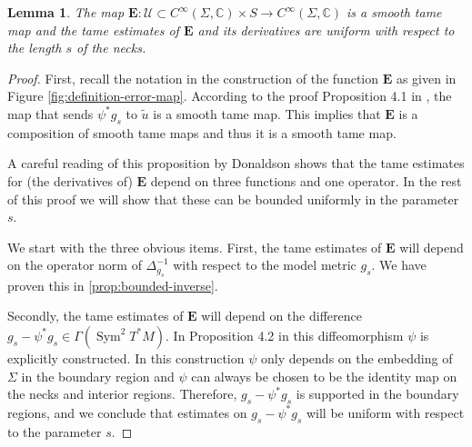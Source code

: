 \documentclass[preprint,12pt]{elsarticle}
\numberwithin{table}{section}
\newtheorem{lemma}{Lemma}[section]
\newcommand{\Z}{\mathbb{Z}}
\newcommand{\C}{\mathbb{C}}
\begin{document}
\begin{lemma}
	\label{lem:Nash-Moser:tameness-E}
	The map $\mathbf{E}\colon \mathcal{U} \subset C^\infty(\Sigma, \C)\times S \to C^\infty(\Sigma, \C)$ is a smooth tame map and the tame estimates of $\mathbf{E}$ and its derivatives are uniform with respect to the length $s$ of the necks.
\end{lemma}
\begin{proof}
	
	First, recall the notation in the construction of the function $\mathbf{E}$ as given in Figure \ref{fig:definition-error-map}.
	According to the proof Proposition 4.1 in \cite{Donaldson2021}, the map that sends $\psi^* g_s$ to $\tilde u$ is a smooth tame map. This implies that $\mathbf{E}$ is a composition of smooth tame maps and thus it is a smooth tame map.

	A careful reading of this proposition by Donaldson shows that the tame estimates for (the derivatives of) $\mathbf{E}$ depend on three functions and one operator. In the rest of this proof we will show that these can be bounded uniformly in the parameter $s$. 
	
	We start with the three obvious items. First, the tame estimates of $\mathbf{E}$ will depend on the operator norm of $\Delta^{-1}_{g_s}$ with respect to the model metric $g_s$. We have proven this in \cref{prop:bounded-inverse}.

	Secondly, the tame estimates of $\mathbf{E}$ will depend on the difference $g_s - \psi^* g_s \in \Gamma(\operatorname{Sym}^2 T^*M)$. In Proposition 4.2 in \cite{Donaldson2021} this diffeomorphism $\psi$ is explicitly constructed. In this construction $\psi$ only depends on the embedding of $\Sigma$ in the boundary region and $\psi$ can always be chosen to be the identity map on the necks and interior regions. Therefore, $g_s - \psi^* g_s$ is supported in the boundary regions, and we conclude that estimates on $g_s - \psi^* g_s$ will be uniform with respect to the parameter $s$.


\end{proof}
\end{document}
